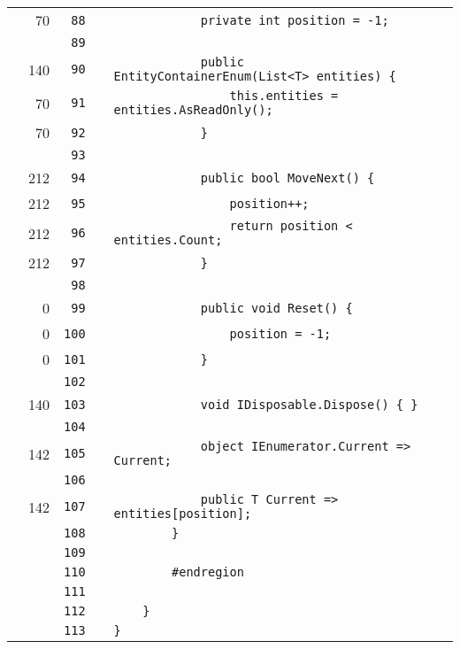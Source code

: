 \documentclass[a4paper,landscape,10pt]{article}
\begin{document}
\begin{longtable}[l]{lrrll}
\cellcolor{green} & 70 & \verb~88~ & & \verb~            private int position = -1;~\\
\cellcolor{gray} &  & \verb~89~ & & \verb~~\\
\cellcolor{green} & 140 & \verb~90~ & & \verb~            public EntityContainerEnum(List<T> entities) {~\\
\cellcolor{green} & 70 & \verb~91~ & & \verb~                this.entities = entities.AsReadOnly();~\\
\cellcolor{green} & 70 & \verb~92~ & & \verb~            }~\\
\cellcolor{gray} &  & \verb~93~ & & \verb~~\\
\cellcolor{green} & 212 & \verb~94~ & & \verb~            public bool MoveNext() {~\\
\cellcolor{green} & 212 & \verb~95~ & & \verb~                position++;~\\
\cellcolor{green} & 212 & \verb~96~ & & \verb~                return position < entities.Count;~\\
\cellcolor{green} & 212 & \verb~97~ & & \verb~            }~\\
\cellcolor{gray} &  & \verb~98~ & & \verb~~\\
\cellcolor{red} & 0 & \verb~99~ & & \verb~            public void Reset() {~\\
\cellcolor{red} & 0 & \verb~100~ & & \verb~                position = -1;~\\
\cellcolor{red} & 0 & \verb~101~ & & \verb~            }~\\
\cellcolor{gray} &  & \verb~102~ & & \verb~~\\
\cellcolor{green} & 140 & \verb~103~ & & \verb~            void IDisposable.Dispose() { }~\\
\cellcolor{gray} &  & \verb~104~ & & \verb~~\\
\cellcolor{green} & 142 & \verb~105~ & & \verb~            object IEnumerator.Current => Current;~\\
\cellcolor{gray} &  & \verb~106~ & & \verb~~\\
\cellcolor{green} & 142 & \verb~107~ & & \verb~            public T Current => entities[position];~\\
\cellcolor{gray} &  & \verb~108~ & & \verb~        }~\\
\cellcolor{gray} &  & \verb~109~ & & \verb~~\\
\cellcolor{gray} &  & \verb~110~ & & \verb~        #endregion~\\
\cellcolor{gray} &  & \verb~111~ & & \verb~~\\
\cellcolor{gray} &  & \verb~112~ & & \verb~    }~\\
\cellcolor{gray} &  & \verb~113~ & & \verb~}~\\
\end{longtable}
\newpage
\end{document}
